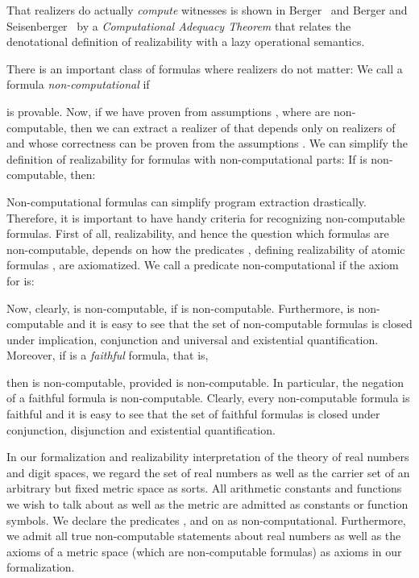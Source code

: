 \documentclass[microtype]{jloganal}
\theoremstyle{plain}
\theoremstyle{definition}
\begin{document}
That realizers do actually \emph{compute} witnesses is shown in 
Berger~\cite{Berger10} and Berger and Seisenberger~\cite{SeisenBerger10} by a 
\emph{Computational Adequacy Theorem} that relates the denotational 
definition of realizability with a lazy operational semantics. 

There is an important class of formulas where realizers do not matter:
We call a formula  \emph{non-computational} if
 
is provable.
Now, if we have proven  from assumptions , where 
 are non-computable, then we can extract a realizer 
of  that depends only on realizers of  and whose
correctness can be proven from the assumptions .
We can simplify the definition of realizability for formulas with 
non-computational parts: If  is non-computable, then:

Non-computational formulas can simplify program extraction drastically.
Therefore, it is important to have handy criteria for recognizing 
non-computable formulas.
First of all, realizability, and hence the question which formulas are 
non-computable, depends on how the predicates 
, defining realizability of atomic formulas , are
axiomatized. We call a predicate  non-computational if the 
axiom for  is:

Now, clearly,  is non-computable, if  is non-computable. Furthermore, 
 is non-computable and it is easy to see that the set of non-computable formulas is 
closed under implication, conjunction and universal and existential 
quantification.
Moreover, if  is a \emph{faithful} formula, that is,

then  is non-computable, provided  is non-computable. In particular, the negation 
of a faithful formula is non-computable.
Clearly, every non-computable formula is faithful and it is easy to see that
the set of faithful formulas is closed under conjunction, disjunction and 
existential quantification.

In our formalization and realizability interpretation of the theory of real
numbers and digit spaces, we regard the set  of real numbers as well as
the carrier set  of an arbitrary but fixed metric space  as sorts.
All arithmetic constants and functions we wish to talk about as well as the
metric  are admitted as constants or function symbols.  We
declare the predicates ,  and  on  as non-computational.
Furthermore, we admit all true non-computable statements about real numbers as well as
the axioms of a metric space (which are non-computable formulas) as axioms in our
formalization.
\end{document}
